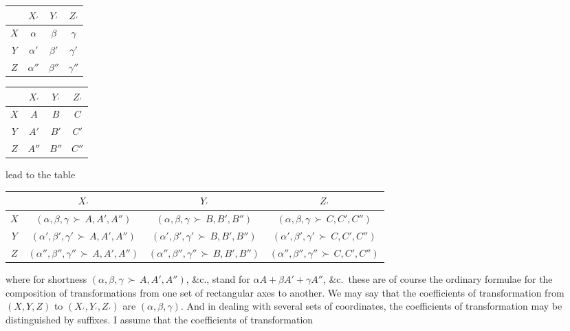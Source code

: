 \documentclass[12pt,a4paper]{article}
\providecommand{\Yright}{\,{\succ}\,}
\theoremstyle{plain}
\begin{document}
\begin{center}
\begin{tabular}{|c|c|c|c|}
\hline
       & $X_{\prime}$ & $Y_{\prime}$ & $Z_{\prime}$ \\
\hline
$X$    & $\alpha$     & $\beta$      & $\gamma$ \\
$Y$    & $\alpha'$    & $\beta'$     & $\gamma'$ \\
$Z$    & $\alpha''$   & $\beta''$    & $\gamma''$ \\
\hline
\end{tabular}
\quad
\begin{tabular}{|c|c|c|c|}
\hline
       & $X_{\prime}$ & $Y_{\prime}$ & $Z_{\prime}$ \\
\hline
$X$    & $A$          & $B$          & $C$ \\
$Y$    & $A'$         & $B'$         & $C'$ \\
$Z$    & $A''$        & $B''$        & $C''$ \\
\hline
\end{tabular}
\end{center}

\noindent lead to the table
\begin{center}
\begin{tabular}{|c|c|c|c|}
\hline
       & $X_{\prime}$ & $Y_{\prime}$ & $Z_{\prime}$ \\
\hline
$X$    & $(\alpha,\beta,\gamma\Yright A,A',A'')$ & $(\alpha,\beta,\gamma\Yright B,B',B'')$ & $(\alpha,\beta,\gamma\Yright C,C',C'')$ \\
$Y$    & $(\alpha',\beta',\gamma'\Yright A,A',A'')$ & $(\alpha',\beta',\gamma'\Yright B,B',B'')$ & $(\alpha',\beta',\gamma'\Yright C,C',C'')$ \\
$Z$    & $(\alpha'',\beta'',\gamma''\Yright A,A',A'')$ & $(\alpha'',\beta'',\gamma''\Yright B,B',B'')$ & $(\alpha'',\beta'',\gamma''\Yright C,C',C'')$ \\
\hline
\end{tabular}
\end{center}

\noindent where for shortness $(\alpha,\beta,\gamma\Yright A,A',A'')$, \&c., stand for $\alpha A+\beta A'+\gamma A''$, \&c.\ these are of course the ordinary formulae for the composition of transformations from one set of rectangular axes to another. We may say that the coefficients of transformation from $(X,Y,Z)$ to $(X_{\prime},Y_{\prime},Z_{\prime})$ are $(\alpha,\beta,\gamma)$. And in dealing with several sets of coordinates, the coefficients of transformation may be distinguished by suffixes. I assume that the coefficients of transformation
\end{document}
